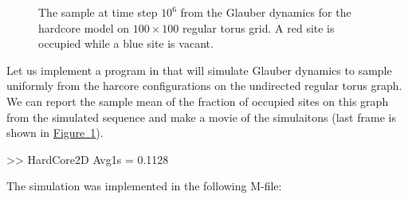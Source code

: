 \begin{figure}[htpb]
\caption{The sample at time step $10^6$ from the Glauber dynamics for the hardcore model on $100\times 100$ regular torus grid.  A red site is occupied while a blue site is vacant.\label{F:HardCore2D100x100Torus}}
\centering   {}
\end{figure}

\begin{simulation}
Let us implement a program in \Matlab that will simulate Glauber dynamics to sample uniformly from the harcore configurations on the undirected regular torus graph. 
We can report the sample mean of the fraction of occupied sites on this graph from the simulated sequence and make a movie of the simulaitons (last frame is shown in \hyperref[F:HardCore2D100x100Torus]{Figure~\ref*{F:HardCore2D100x100Torus}}).
\begin{VrbM}
>> HardCore2D
Avg1s =    0.1128
\end{VrbM}
The simulation was implemented in the following M-file:
\end{simulation}


